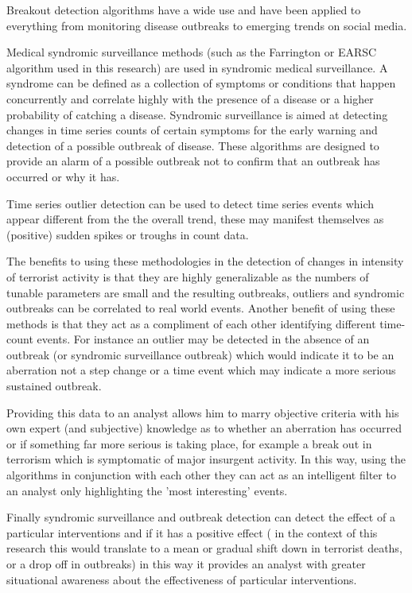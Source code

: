 Breakout detection algorithms have a wide use and have been applied to everything from monitoring disease outbreaks to emerging trends on social media.

Medical syndromic surveillance methods (such as the Farrington or EARSC algorithm used in this research) are used in syndromic medical surveillance. A syndrome can be defined as a collection of symptoms or conditions that happen concurrently and correlate highly with the presence of a disease or a higher probability of catching a disease. Syndromic surveillance is aimed at detecting changes in time series counts of certain symptoms for the early warning and detection of a possible outbreak of disease. These algorithms are designed to provide an alarm of a possible outbreak not to confirm that an outbreak has occurred or why it has.

Time series outlier detection can be used to detect time series events which appear different from the the overall trend, these may manifest themselves as (positive) sudden spikes or troughs in count data.

The benefits to using these methodologies in the detection of changes in intensity of terrorist activity is that they are highly generalizable as the numbers of tunable parameters are small and the resulting outbreaks, outliers and syndromic outbreaks can be correlated to real world events. Another benefit of using these methods is that they act as a compliment of each other
identifying different time-count events. For instance an outlier may be detected in the absence of an outbreak (or syndromic surveillance outbreak) which would indicate it to be an aberration not a step change or a time event which may indicate a more serious sustained outbreak.

Providing this data to an analyst allows him to marry objective criteria with his own expert (and subjective) knowledge as to whether an aberration has occurred or if something far more serious is taking place, for example a break out in terrorism which is symptomatic of major insurgent activity. In this way, using the algorithms in conjunction with each other they can act as an intelligent filter to an analyst only highlighting the 'most interesting' events. 

Finally syndromic surveillance and outbreak detection can detect the effect of a particular interventions and if it has a positive effect ( in the context of this research this would translate to a mean or gradual shift down in terrorist deaths, or a drop off in outbreaks) in this  way it provides an analyst with greater situational awareness about the effectiveness of particular interventions. 

